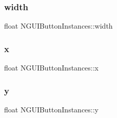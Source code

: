 \subsubsection{\texorpdfstring{width}{width}}
{\footnotesize\ttfamily float N\+G\+U\+I\+Button\+Instances\+::width}

\hypertarget{class_n_g_u_i_button_instances_aeb27d0671d0764ec6cc251310acee798}{}\label{class_n_g_u_i_button_instances_aeb27d0671d0764ec6cc251310acee798} 
\subsubsection{\texorpdfstring{x}{x}}
{\footnotesize\ttfamily float N\+G\+U\+I\+Button\+Instances\+::x}

\hypertarget{class_n_g_u_i_button_instances_a4fe7ac36eb2d4dfa9b2510a68a609e4c}{}\label{class_n_g_u_i_button_instances_a4fe7ac36eb2d4dfa9b2510a68a609e4c} 
\subsubsection{\texorpdfstring{y}{y}}
{\footnotesize\ttfamily float N\+G\+U\+I\+Button\+Instances\+::y}


